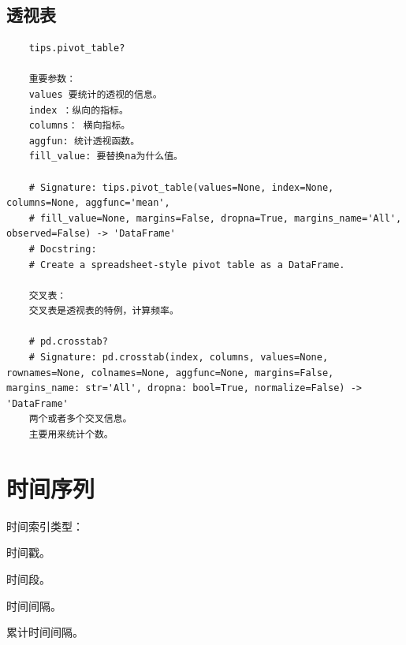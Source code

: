 \documentclass{article}
\begin{document}
\subsection{透视表}
\begin{lstlisting}
	tips.pivot_table?
	
	重要参数：
	values 要统计的透视的信息。
	index ：纵向的指标。
	columns： 横向指标。
	aggfun: 统计透视函数。
	fill_value: 要替换na为什么值。
	
	# Signature: tips.pivot_table(values=None, index=None, columns=None, aggfunc='mean',
	# fill_value=None, margins=False, dropna=True, margins_name='All', observed=False) -> 'DataFrame'
	# Docstring:
	# Create a spreadsheet-style pivot table as a DataFrame.
	
	交叉表：
	交叉表是透视表的特例，计算频率。
	
	# pd.crosstab?
	# Signature: pd.crosstab(index, columns, values=None, rownames=None, colnames=None, aggfunc=None, margins=False, margins_name: str='All', dropna: bool=True, normalize=False) -> 'DataFrame'
	两个或者多个交叉信息。
	主要用来统计个数。
\end{lstlisting}

\section{时间序列}
时间索引类型：

时间戳。

时间段。

时间间隔。

累计时间间隔。
\end{document}
